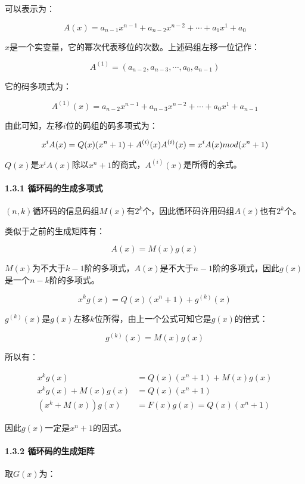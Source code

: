 \documentclass[
]{article}
\begin{document}
可以表示为：

$$
A(x) = a_{n-1}x^{n-1}+a_{n-2}x^{n-2}+\cdots+a_{1}x^{1}+a_{0}
$$

$x$是一个实变量，它的幂次代表移位的次数。上述码组左移一位记作：

$$
A^{(1)} = (a_{n-2},a_{n-3},\cdots,a_{0},a_{n-1})
$$

它的码多项式为：

$$
A^{(1)}(x) = a_{n-2}x^{n-1}+a_{n-3}x^{n-2}+\cdots+a_{0}x^{1}+a_{n-1}
$$

由此可知，左移$i$位的码组的码多项式为：

$$x^iA(x) = Q(x)(x^n+1)+A^{(i)}(x)\\
A^{(i)}(x) = x^iA(x) \space mod \space (x^n+1)$$

$Q(x)$是$x^iA(x)$除以$x^n+1$的商式，$A^{(i)}(x)$是所得的余式。

\hypertarget{header-n44}{%
\paragraph{1.3.1 循环码的生成多项式}\label{header-n44}}

$(n,k)$循环码的信息码组$M(x)$有$2^k$个，因此循环码许用码组$A(x)$也有$2^k$个。

类似于之前的生成矩阵有：

$$
A(x)=M(x)g(x)
$$

$M(x)$为不大于$k-1$阶的多项式，$A(x)$是不大于$n-1$阶的多项式，因此$g(x)$是一个$n-k$阶的多项式。

$$
x^kg(x)=Q(x)(x^n+1)+g^{(k)}(x)
$$

$g^{(k)}(x)$是$g(x)$左移$k$位所得，由上一个公式可知它是$g(x)$的倍式：

$$
g^{(k)}(x)=M(x)g(x)
$$

所以有：

$$
\begin{align}
x^kg(x)&=Q(x)(x^n+1)+M(x)g(x)\\
x^kg(x)+M(x)g(x)&=Q(x)(x^n+1)\\
(x^k+M(x))g(x)&=F(x)g(x)=Q(x)(x^n+1)
\end{align}
$$

因此$g(x)$一定是$x^n+1$的因式。

\hypertarget{header-n55}{%
\paragraph{1.3.2 循环码的生成矩阵}\label{header-n55}}

取$G(x)$为：
\end{document}
